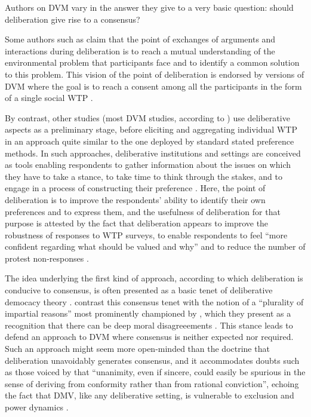 \documentclass[version=last, pagesize, twoside=off, bibliography=totoc, DIV=calc, fontsize=14pt, a4paper, french, english]{scrartcl}
\begin{document}
Authors on DVM vary in the answer they give to a very basic question: should deliberation give rise to a consensus?

Some authors such as \citet{vatn_institutional_2009} claim that the point of exchanges of arguments and interactions during deliberation is to reach a mutual understanding of the environmental problem that participants face and to identify a common solution to this problem. This vision of the point of deliberation is endorsed by versions of DVM where the goal is to reach a consent among all the participants in the form of a single social WTP \citep{orchard-webb_deliberative_2016}.

By contrast, other studies (most DVM studies, according to \citet{bunse_what_2015}) use deliberative aspects as a preliminary stage, before eliciting and aggregating individual WTP in an approach quite similar to the one deployed by standard stated preference methods. In such approaches, deliberative institutions and settings are conceived as tools enabling respondents to gather information about the issues on which they have to take a stance, to take time to think through the stakes, and to engage in a process of constructing their preference \citep{braga_preference_2005}. Here, the point of deliberation is to improve the respondents' ability to identify their own preferences and to express them, and the usefulness of deliberation for that purpose is attested by the fact that deliberation appears to improve the robustness of responses to WTP surveys, to enable respondents to feel ``more confident regarding what should be valued and why'' \citep[p. 125, cited by \citet{bartkowski_beyond_2018}]{svedsater_economic_2003} and to reduce the number of protest non-responses \citep{szabo_reducing_2011}.

The idea underlying the first kind of approach, according to which deliberation is conducive to consensus, is often presented as a basic tenet of deliberative democacy theory \citep{wilson_discourse-based_2002}. \citet{bartkowski_beyond_2018} contrast this consensus tenet with the notion of a ``plurality of impartial reasons'' most prominently championed by \citet{sen_idea_2009}, which they present as a recognition that there can be deep moral disagreeements \citep{dryzek_deliberative_2013}. This stance leads \citet{bartkowski_beyond_2018} to defend an approach to DVM where consensus is neither expected nor required. Such an approach might seem more open-minded than the doctrine that deliberation unavoidably generates consensus, and it accommodates doubts such as those voiced by \citet{elster_sour_1983} that ``unanimity, even if sincere, could easily be spurious in the sense of deriving from conformity rather than from rational conviction'', echoing the fact that DMV, like any deliberative setting, is vulnerable to exclusion and power dynamics \citep{volker_exploring_2016,vargas_background_2016,vargas_problem_2017}.
\end{document}
